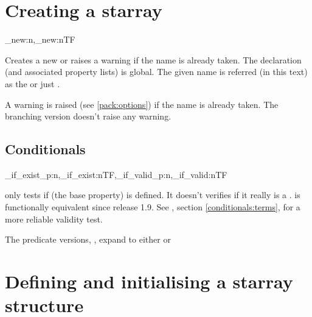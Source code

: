 \documentclass[10pt]{article}
\begin{document}
\section{Creating a starray}\label{pack:new}
\begin{codedescribe}{\starray_new:n,\starray_new:nTF}
\begin{codesyntax}%
\end{codesyntax}
Creates a new  or raises a warning  if the name is already taken. The declaration (and associated property lists) is global. The given name is referred (in this text) as the  or just . 
\end{codedescribe}
\begin{tsremark}
  A warning is raised (see \ref{pack:options}) if the name is already taken. The branching version doesn't raise any warning.
\end{tsremark}

\subsection{Conditionals}\label{conditionals:exist}
\begin{codedescribe}[code,EXP,new=2023/05/20,update=2024/03/28]{\starray_if_exist_p:n,\starray_if_exist:nTF,\starray_if_valid_p:n,\starray_if_valid:nTF}
\begin{codesyntax}%
\end{codesyntax}
 only tests if  (the base property) is defined. It doesn't verifies if it really is a  .  is functionally equivalent since release 1.9. See , section \ref{conditionals:terms}, for a more reliable validity test.
\end{codedescribe}
\begin{tsremark}
The predicate versions, , expand to either  or\break  {}
\end{tsremark}

\section{Defining and initialising a starray structure}\label{pack:def}
\end{document}
